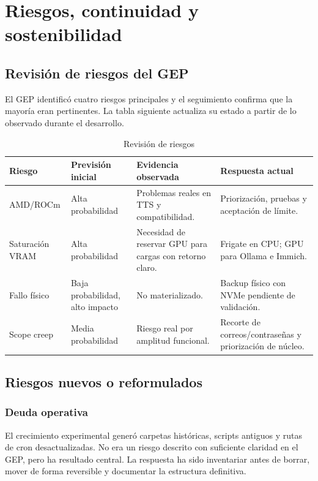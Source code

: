 \chapter{Riesgos, continuidad y sostenibilidad}

\section{Revisión de riesgos del GEP}
El GEP identificó cuatro riesgos principales y el seguimiento confirma que la mayoría eran pertinentes. La tabla siguiente actualiza su estado a partir de lo observado durante el desarrollo.

\begin{table}[H]
  \centering
  \caption{Revisión de riesgos}
  \label{tab:revision-riesgos}
  \begin{tabularx}{\textwidth}{lXXX}
    \toprule
    Riesgo & Previsión inicial & Evidencia observada & Respuesta actual \\
    \midrule
    AMD/ROCm & Alta probabilidad & Problemas reales en TTS y compatibilidad. & Priorización, pruebas y aceptación de límite. \\
    Saturación VRAM & Alta probabilidad & Necesidad de reservar GPU para cargas con retorno claro. & Frigate en CPU; GPU para Ollama e Immich. \\
    Fallo físico & Baja probabilidad, alto impacto & No materializado. & Backup físico con NVMe pendiente de validación. \\
    Scope creep & Media probabilidad & Riesgo real por amplitud funcional. & Recorte de correos/contraseñas y priorización de núcleo. \\
    \bottomrule
  \end{tabularx}
\end{table}

\section{Riesgos nuevos o reformulados}
\subsection{Deuda operativa}
El crecimiento experimental generó carpetas históricas, scripts antiguos y rutas de cron desactualizadas. No era un riesgo descrito con suficiente claridad en el GEP, pero ha resultado central. La respuesta ha sido inventariar antes de borrar, mover de forma reversible y documentar la estructura definitiva.

